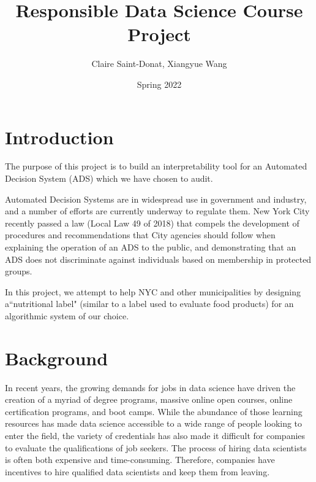 \documentclass[11pt]{article}
\title{Responsible Data Science Course Project}
\author{Claire Saint-Donat, Xiangyue Wang}
\affil{Center for Data Science, New York University}
\date{Spring 2022}
\begin{document}
\maketitle
\tableofcontents

\section{Introduction}

The purpose of this project is to build an interpretability tool for an Automated Decision System (ADS) which we have chosen to audit.

Automated Decision Systems are in widespread use in government and industry, and a number of efforts are currently underway to regulate them.  New York City recently passed a law (Local Law 49 of 2018) that compels the development of procedures and recommendations that City agencies should follow when explaining the operation of an ADS to the public, and demonstrating that an ADS does not discriminate against individuals based on membership in protected groups.  

In this project, we attempt to help NYC and other municipalities by designing a``nutritional label" (similar to a label used to evaluate food products) for an algorithmic system of our choice. 
\pagebreak

\section{Background}
In recent years, the growing demands for jobs in data science have driven the creation of a myriad of degree programs, massive online open courses, online certification programs, and boot camps. While the abundance of those learning resources has made data science accessible to a wide range of people looking to enter the field, the variety of credentials has also made it difficult for companies to evaluate the qualifications of job seekers. The process of hiring data scientists is often both expensive and time-consuming. Therefore, companies have incentives to hire qualified data scientists and keep them from leaving. 
\end{document}
